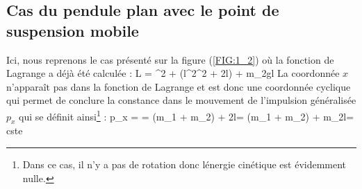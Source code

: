 \subsection{Cas du pendule plan avec le point de suspension mobile}

Ici, nous reprenons le cas pr\'esent\'e sur la figure (\ref{FIG:1_2}) o\`u la fonction de Lagrange a d\'ej\`a \'et\'e calcul\'ee :
\benn
	L = ^{2} + \left(l^{2}\dot{\varphi}^{2} + 2l\cos\varphi{}\dot{\varphi}\right) + m_{2}gl\cos\varphi
\eenn
La coordonn\'ee $x$ n'appara\^it pas dans la fonction de Lagrange et est donc une coordonn\'ee cyclique qui permet de conclure la constance dans le mouvement de l'impulsion g\'en\'eralis\'ee $p_{x}$ qui se d\'efinit ainsi\footnote{Dans ce cas, il n'y a pas de rotation donc l\'energie cin\'etique est \'evidemment nulle.} :
\benn
	p_{x} =  = (m_{1} + m_{2}) + 2l\dot{\varphi}\cos\varphi = (m_{1} + m_{2}) + m_{2}l\dot{\varphi}\cos\varphi = cste
\eenn

